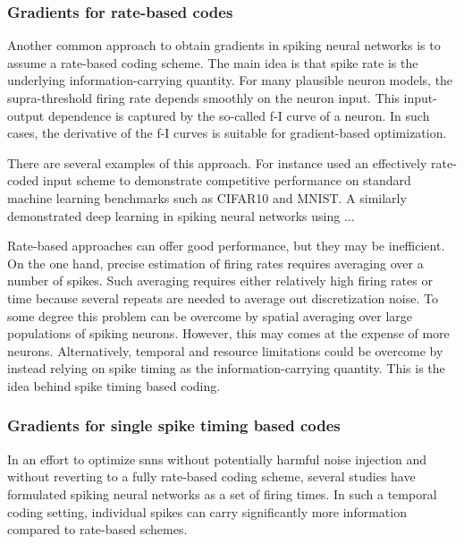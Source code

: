\documentclass[journal,onecolumn,11pt]{IEEEtran}
\begin{document}
\subsubsection{Gradients for rate-based codes}

Another common approach to obtain gradients in spiking neural networks is to
assume a rate-based coding scheme.
The main idea is that spike rate is the underlying information-carrying quantity.
For many plausible neuron models, the supra-threshold firing rate depends
smoothly on the neuron input. This input-output dependence is captured by the
so-called f-I curve of a neuron.
In such cases, the derivative of the f-I curves is suitable for gradient-based optimization. 


There are several examples of this approach. 
For instance \citet{Hunsberger_Eliasmith15_spikdeep} used an effectively
rate-coded input scheme to demonstrate competitive performance on standard
machine learning benchmarks such as CIFAR10 and MNIST.
A similarly \cite{Lee_etal16_traideep} demonstrated deep learning in spiking
neural networks using ... %

Rate-based approaches can offer good performance, but they may be inefficient.
On the one hand, precise estimation of firing rates requires averaging over
a number of spikes.  Such averaging requires either relatively high firing rates or
time because several repeats are needed to average out discretization noise.  
To some degree this problem can be overcome by spatial averaging over
large populations of spiking neurons. However, this may comes at the expense of
more neurons. 
Alternatively, temporal and resource limitations could be overcome by instead relying on
spike timing as the information-carrying quantity. This is the idea behind
spike timing based coding.


\subsubsection{Gradients for single spike timing based codes}

In an effort to optimize \glspl{snn} without potentially harmful noise
injection and without reverting to a fully rate-based coding scheme, 
several studies have formulated spiking neural
networks as a set of firing times.
In such a temporal coding setting, individual spikes can carry significantly more
information compared to rate-based schemes.
\end{document}
